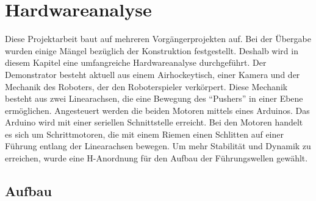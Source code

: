 \chapter{Hardwareanalyse}  
\label{ch:Hardware}
Diese Projektarbeit baut auf mehreren Vorgängerprojekten auf. Bei der Übergabe wurden einige Mängel bezüglich der Konstruktion festgestellt. Deshalb wird in diesem Kapitel eine umfangreiche Hardwareanalyse durchgeführt.
Der Demonstrator besteht aktuell aus einem Airhockeytisch, einer Kamera und der Mechanik des Roboters, der den Roboterspieler verkörpert. Diese Mechanik besteht aus zwei Linearachsen, die eine Bewegung des “Pushers” in einer Ebene ermöglichen. Angesteuert werden die beiden Motoren mittels eines Arduinos. Das Arduino wird mit einer seriellen Schnittstelle erreicht. Bei den Motoren handelt es sich um Schrittmotoren, die mit einem Riemen einen Schlitten auf einer Führung entlang der Linearachsen bewegen. Um mehr Stabilität und Dynamik zu erreichen, wurde eine H-Anordnung für den Aufbau der Führungswellen gewählt.  

\section{Aufbau}
\label{sect:Aufbau}


